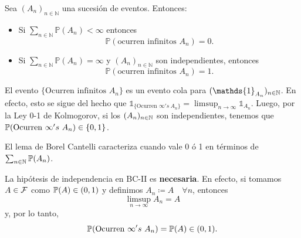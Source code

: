 \begin{lemma}
    Sea \((A_n)_{n\in\mathbb{N}}\) una sucesión de eventos. Entonces:
    \begin{itemize}
		\item[I)] Si \(\sum_{n\in\mathbb{N}} \mathbb{P}(A_n) < \infty\) entonces 
		\[ \mathbb{P}(\text{ocurren infinitos } A_n) = 0. \]

		\item[II)] Si \(\sum_{n\in\mathbb{N}} \mathbb{P}(A_n) = \infty\) y \((A_n)_{n\in\mathbb{N}}\) son independientes, entonces 
		\[ \mathbb{P}(\text{ocurren infinitos } A_n) = 1. \]
    \end{itemize}
\end{lemma}

\begin{remark}
	El evento $\{\text{Ocurren infinitos } A_{n}\}$ es un evento cola para $(\mathds{1}_{A_{n}})_{n \in \N}$. En efecto, esto se sigue del hecho que $\mathds{1}_{\{\text{Ocurren } \infty's \ A_{n}\}} = \limsup_{n \to \infty} \mathds{1}_{A_{n}}$. Luego, por la Ley 0-1 de Kolmogorov, si los $(A_{n})_{n \in \mathbb{N}}$ son independientes, tenemos que $\mathbb{P}(\text{Ocurren } \infty's \ A_{n}) \in \{0,1\}$. \par
	El lema de Borel Cantelli caracteriza cuando vale 0 ó 1 en términos de $\sum_{n \in \mathbb{N}} \mathbb{P}(A_{n})$.
\end{remark}

\begin{note}
	La hipótesis  de independencia en BC-II es \textbf{necesaria}. En efecto, si tomamos $A \in \mathcal{F}$ como $\mathbb{P}(A) \in (0,1)$ y definimos $A_{n} \coloneq A \quad \forall n$, entonces 
	\[ \limsup_{n \to \infty} A_{n} = A \]
	y, por lo tanto,
	\[ \mathbb{P}(\text{Ocurren } \infty's \ A_{n}) = \mathbb{P}(A) \in (0,1). \]
\end{note}

